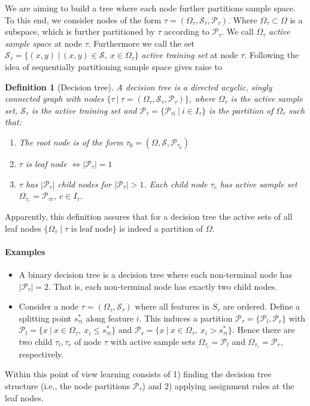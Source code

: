 \documentclass[12pt,a4paper]{article}
\newtheorem{definition}{Definition}
\begin{document}
 We are aiming to build a tree where each node further partitions sample space. To this end, we consider nodes of the form $\tau=(\Omega_\tau, \mathcal S_\tau, \mathcal P_\tau)$. Where $\Omega_\tau \subset \Omega$ is a subspace, which is further partitioned by $\tau$ according to $\mathcal P_\tau$. We call $\Omega_\tau$ \textit{active  sample space} at node $\tau$. Furthermore we call the set $\mathcal S_{\tau} = \{(x, y) ~ | ~ (x, y) \in \mathcal S, ~  x \in \Omega_\tau\}$  \textit{active training set} at node $\tau$. Following the idea of sequentially partitioning sample space gives raise to 
 
 \begin{definition}[Decision tree]
 	A decision tree is a directed acyclic, singly connected graph with nodes $\{\tau ~ | ~\tau = (\Omega_\tau, \mathcal S_\tau, \mathcal P_\tau)\}$, where $\Omega_\tau$ is the active sample set, $\mathcal S_\tau$ is the active training set 
 	and $\mathcal P_\tau = \{\mathcal P_{\tau i} ~ | ~  i \in I_\tau\}$ 
 	is the partition of $\Omega_\tau$ such that: 
 	\begin{enumerate}
 		\item The root node is of the form  $\tau_0=(\Omega, \mathcal S, \mathcal P_{\tau_0})$
 		\item $\tau$ is leaf node $\Leftrightarrow |\mathcal P_\tau| = 1$   
 		\item $\tau$ has $|\mathcal P_\tau|$ child nodes for $|\mathcal P_\tau| >1$. Each child node $\tau_c$ has active sample set $\Omega_{\tau_c} = \mathcal P_{\tau c}, ~ c \in I_\tau$.
 	\end{enumerate} 
 \end{definition}
Apparently, this definition assures that for a decision tree the active sets of all leaf nodes $\{\Omega_\tau \mid \tau \text{ is leaf node}\}$ is indeed a partition of $\Omega$.

\paragraph{Examples}
\begin{itemize}
	 \item A binary decision tree is a decision tree where each non-terminal node has $|\mathcal P_\tau| = 2$. That is, each non-terminal node has exactly two child nodes.

	\item  Consider a node $\tau=(\Omega_\tau, \mathcal S_\tau)$ where all features in $S_\tau$ are ordered. Define a splitting point $s^*_{\tau i}$ along feature $i$. This induces a partition $\mathcal P_\tau = \{\mathcal P_l, \mathcal P_r\}$ with $\mathcal P_l = \{x ~|~ x\in\Omega_\tau,~ x_i \leq s^*_{\tau i}\}$ and $\mathcal P_r = \{x ~|~ x\in\Omega_\tau,~ x_i > s^*_{\tau i}\}$. Hence there are two child $\tau_l, \tau_r$   of node $\tau$ with active sample sets $\Omega_{\tau_l}=\mathcal P_l$ and $\Omega_{\tau_r}=\mathcal P_r$, respectively.
\end{itemize}
Within this point of view learning consists of 1) finding the decision tree structure (i.e., the node partitions $\mathcal P_\tau$) and 2) applying assignment rules at the leaf nodes.  
 
\end{document}
